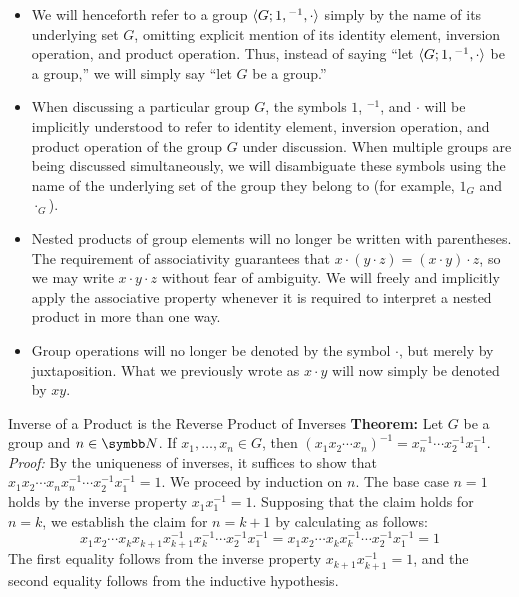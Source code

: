 \begin{itemize}
	\item We will henceforth refer to a group ${\langle {G; 1, {}^{-1}, \cdot} \rangle}$ simply by the name of its underlying set $G$, omitting explicit mention of its identity element, inversion operation, and product operation. Thus, instead of saying ``let ${\langle {G; 1, {}^{-1}, \cdot} \rangle}$ be a group,'' we will simply say ``let $G$ be a group.''
	\item When discussing a particular group $G$, the symbols $1$, ${}^{-1}$, and $\cdot$ will be implicitly understood to refer to identity element, inversion operation, and product operation of the group $G$ under discussion. When multiple groups are being discussed simultaneously, we will disambiguate these symbols using the name of the underlying set of the group they belong to (for example, $1_G$ and $\cdot_G$).
	\item Nested products of group elements will no longer be written with parentheses. The requirement of associativity guarantees that $x \cdot (y \cdot z) = (x \cdot y) \cdot z$, so we may write $x \cdot y \cdot z$ without fear of ambiguity. We will freely and implicitly apply the associative property whenever it is required to interpret a nested product in more than one way.
	\item Group operations will no longer be denoted by the symbol $\cdot$, but merely by juxtaposition. What we previously wrote as $x \cdot y$ will now simply be denoted by $xy$.
\end{itemize}

\begin{thmbox}{Inverse of a Product is the Reverse Product of Inverses}
	\textbf{Theorem:} Let $G$ be a group and $n \in \N$. If $x_1, \dots, x_n \in G$, then $(x_1 x_2 \cdots x_n)^{-1} = x_n^{-1} \cdots x_2^{-1} x_1^{-1}$.
	\tcblower
	\textit{Proof:} By the uniqueness of inverses, it suffices to show that $x_1 x_2 \cdots x_n x_n^{-1} \cdots x_2^{-1} x_1^{-1} = 1$. We proceed by induction on $n$. The base case $n = 1$ holds by the inverse property $x_1 x_1^{-1} = 1$. Supposing that the claim holds for $n = k$, we establish the claim for $n = k + 1$ by calculating as follows:
	\[ x_1 x_2 \cdots x_k x_{k+1} x_{k+1}^{-1} x_k^{-1} \cdots x_2^{-1} x_1^{-1} = x_1 x_2 \cdots x_k x_k^{-1} \cdots x_2^{-1} x_1^{-1} = 1 \]
	The first equality follows from the inverse property $x_{k+1} x_{k+1}^{-1} = 1$, and the second equality follows from the inductive hypothesis.
\end{thmbox}

